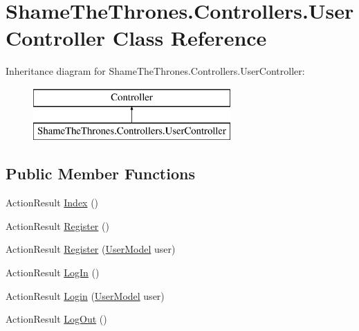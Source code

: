\hypertarget{class_shame_the_thrones_1_1_controllers_1_1_user_controller}{}\section{Shame\+The\+Thrones.\+Controllers.\+User\+Controller Class Reference}
\label{class_shame_the_thrones_1_1_controllers_1_1_user_controller}
Inheritance diagram for Shame\+The\+Thrones.\+Controllers.\+User\+Controller\+:\begin{figure}[H]
\begin{center}
\leavevmode
\includegraphics[height=2.000000cm]{d8/dd7/class_shame_the_thrones_1_1_controllers_1_1_user_controller}
\end{center}
\end{figure}
\subsection*{Public Member Functions}
\begin{DoxyCompactItemize}
\item 
Action\+Result \hyperlink{class_shame_the_thrones_1_1_controllers_1_1_user_controller_a6ce8baf017c6d47ab611b63e3e5bf4ef}{Index} ()
\item 
Action\+Result \hyperlink{class_shame_the_thrones_1_1_controllers_1_1_user_controller_aba3ef3e0b37b2c6b8ee4a693e37ef337}{Register} ()
\item 
Action\+Result \hyperlink{class_shame_the_thrones_1_1_controllers_1_1_user_controller_a0c708385422e48372babcf838eab177f}{Register} (\hyperlink{class_shame_the_thrones_1_1_models_1_1_user_model}{User\+Model} user)
\item 
Action\+Result \hyperlink{class_shame_the_thrones_1_1_controllers_1_1_user_controller_afcf01e012eda4e7a1387d071ee056410}{Log\+In} ()
\item 
Action\+Result \hyperlink{class_shame_the_thrones_1_1_controllers_1_1_user_controller_aefeac25ee1a0f49812c9eeb34c5d1df3}{Login} (\hyperlink{class_shame_the_thrones_1_1_models_1_1_user_model}{User\+Model} user)
\item 
Action\+Result \hyperlink{class_shame_the_thrones_1_1_controllers_1_1_user_controller_accb5572e0c35bde5ffa6420b9f45c4f9}{Log\+Out} ()
\end{DoxyCompactItemize}


